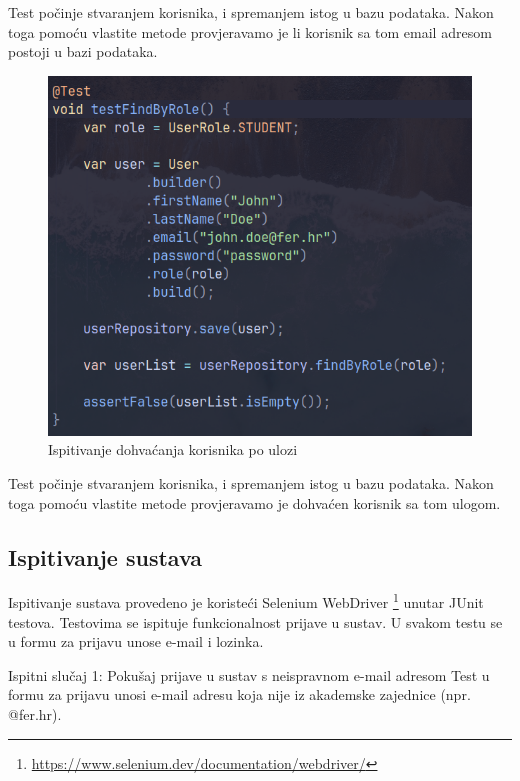 Test počinje stvaranjem korisnika, i spremanjem istog u bazu podataka. Nakon 
toga pomoću vlastite metode provjeravamo je li korisnik sa tom email adresom 
postoji u bazi podataka.

\begin{figure}[H]
	\includegraphics[scale=0.6]{slike/test_6.png}
	\centering
	\caption{Ispitivanje dohvaćanja korisnika po ulozi}
	\label{fig:test_6}
\end{figure}

Test počinje stvaranjem korisnika, i spremanjem istog u bazu podataka. Nakon 
toga pomoću vlastite metode provjeravamo je dohvaćen korisnik sa tom ulogom.
			
					
			
			
			\subsection{Ispitivanje sustava}
			
Ispitivanje sustava provedeno je koristeći Selenium WebDriver \footnote{\url{https://www.selenium.dev/documentation/webdriver/}} unutar JUnit testova. Testovima se ispituje funkcionalnost prijave u sustav. U svakom testu se u formu za prijavu unose e-mail i lozinka.

Ispitni slučaj 1: Pokušaj prijave u sustav s neispravnom e-mail adresom	
Test u formu za prijavu unosi e-mail adresu koja nije iz akademske zajednice (npr. @fer.hr).   

